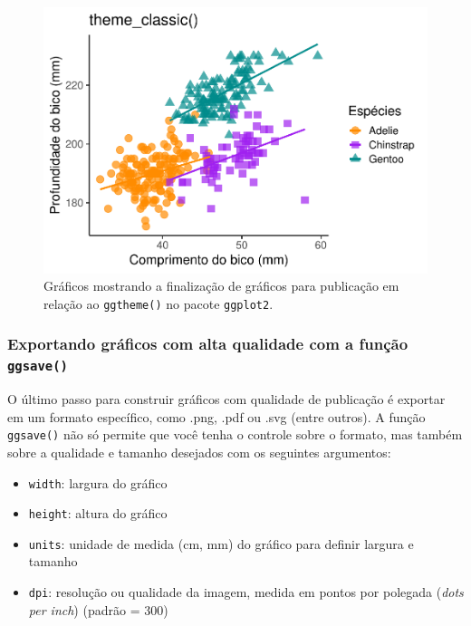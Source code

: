 \documentclass[
]{article}
\providecommand{\tightlist}{%
  \setlength{\itemsep}{0pt}\setlength{\parskip}{0pt}}
\begin{document}
\begin{figure}
\centering
\includegraphics{epr_files/figure-latex/fig-plot-final-ggtheme-3.pdf}
\caption{\label{fig:fig-plot-final-ggtheme-3}Gráficos mostrando a finalização de gráficos para publicação em relação ao \texttt{ggtheme()} no pacote \texttt{ggplot2}.}
\end{figure}

\hypertarget{exportando-gruxe1ficos-com-alta-qualidade-com-a-funuxe7uxe3o-ggsave}{%
\subsubsection{\texorpdfstring{Exportando gráficos com alta qualidade com a função \texttt{ggsave()}}{Exportando gráficos com alta qualidade com a função ggsave()}}\label{exportando-gruxe1ficos-com-alta-qualidade-com-a-funuxe7uxe3o-ggsave}}

O último passo para construir gráficos com qualidade de publicação é exportar em um formato específico, como .png, .pdf ou .svg (entre outros). A função \texttt{ggsave()} não só permite que você tenha o controle sobre o formato, mas também sobre a qualidade e tamanho desejados com os seguintes argumentos:

\begin{itemize}
\tightlist
\item
  \texttt{width}: largura do gráfico
\item
  \texttt{height}: altura do gráfico
\item
  \texttt{units}: unidade de medida (cm, mm) do gráfico para definir largura e tamanho
\item
  \texttt{dpi}: resolução ou qualidade da imagem, medida em pontos por polegada (\emph{dots per inch}) (padrão = 300)
\end{itemize}
\end{document}
